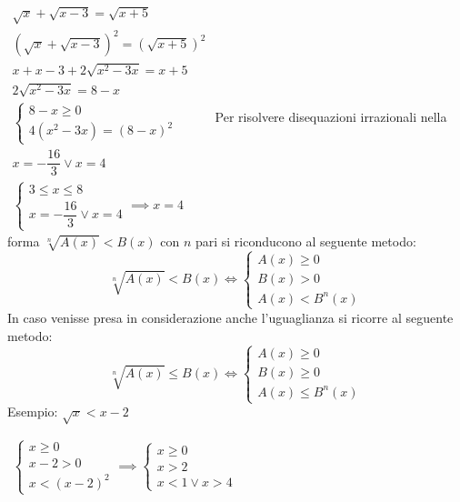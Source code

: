 \documentclass[a4paper]{article}
\theoremstyle{plain}
\theoremstyle{definition}
\theoremstyle{remark}
\begin{document}
$\begin{array}{l}
    \sqrt{x}+\sqrt{x-3}=\sqrt{x+5}\\
    \left(\sqrt{x}+\sqrt{x-3}\right)^2=\left(\sqrt{x+5}\right)^2\\
    x+x-3+2\sqrt{x^2-3x}=x+5\\
    2\sqrt{x^2-3x}=8-x\\
    \begin{cases}
        8-x\geq0\\
        4(x^2-3x)=(8-x)^2
    \end{cases}\\
    x=-\dfrac{16}{3}\lor x=4\\
    \begin{cases}
        3\leq x\leq8\\
        x=-\dfrac{16}{3}\lor x=4
    \end{cases} \implies x=4
\end{array}$
\newpage
Per risolvere disequazioni irrazionali nella forma $\sqrt[n]{A(x)}<B(x)$ con $n$ pari si riconducono al seguente metodo:
\begin{equation}
    \sqrt[n]{A(x)}<B(x)\iff\begin{cases}
        A(x)\geq0\\
        B(x)>0\\
        A(x)<B^n(x)
    \end{cases}
\end{equation}
In caso venisse presa in considerazione anche l'uguaglianza si ricorre al seguente metodo:
\begin{equation}
    \sqrt[n]{A(x)}\leq B(x)\iff\begin{cases}
        A(x)\geq0\\
        B(x)\geq0\\
        A(x)\leq B^n(x)
    \end{cases}
\end{equation}
Esempio: $\sqrt{x}<x-2$

$\begin{array}{l}
   \begin{cases}
       x\geq0\\
       x-2>0\\
       x<(x-2)^2
   \end{cases}\implies\begin{cases}
       x\geq0\\
       x>2\\
       x<1\lor x>4
   \end{cases}
\end{array}$
\end{document}
